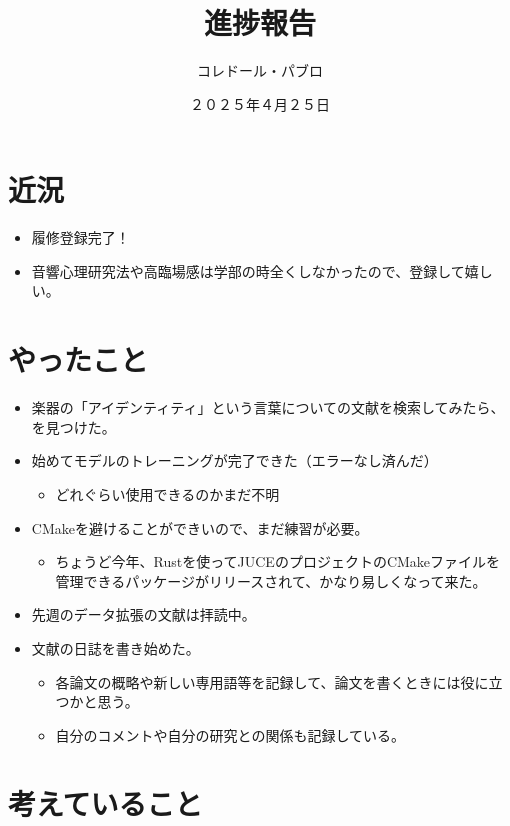\documentclass[a4paper, 12pt]{article}
\title{進捗報告}
\author{コレドール・パブロ}
\date{２０２５年４月２５日}
\begin{document}
\maketitle

\section*{近況}
\begin{itemize}
    \item 履修登録完了！
    \item 音響心理研究法や高臨場感は学部の時全くしなかったので、登録して嬉しい。
\end{itemize} 

\section*{やったこと}
\begin{itemize}
    \item 楽器の「アイデンティティ」という言葉についての文献を検索してみたら、\cite{IdentityAugmenting}を見つけた。
    \item 始めてモデルのトレーニングが完了できた（エラーなし済んだ）
    \begin{itemize}
        \item どれぐらい使用できるのかまだ不明
    \end{itemize}
    \item CMakeを避けることができいので、まだ練習が必要。
    \begin{itemize}
        \item ちょうど今年、Rustを使ってJUCEのプロジェクトのCMakeファイルを管理できるパッケージがリリースされて、かなり易しくなって来た。
    \end{itemize}
    \item 先週のデータ拡張の文献は拝読中。
    \item 文献の日誌を書き始めた。
    \begin{itemize}
        \item 各論文の概略や新しい専用語等を記録して、論文を書くときには役に立つかと思う。
        \item 自分のコメントや自分の研究との関係も記録している。
    \end{itemize}
\end{itemize}

\section*{考えていること}
\end{document}

